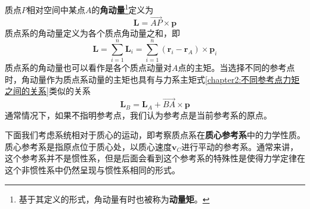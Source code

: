 质点$P$相对空间中某点$A$的{\bf 角动量}\footnote{基于其定义的形式，角动量有时也被称为{\bf 动量矩}。}定义为
\begin{equation}
	\boldsymbol{L} = \vec{AP} \times \boldsymbol{p}
\end{equation}
质点系的角动量定义为各个质点角动量之和，即
\begin{equation}
	\boldsymbol{L} = \sum_{i=1}^n \boldsymbol{L}_i = \sum_{i=1}^n (\boldsymbol{r}_i - \boldsymbol{r}_A) \times\boldsymbol{p}_i
	\label{chapter2:系统角动量的定义式}
\end{equation}
质点系的角动量也可以看作是各个质点动量对$A$点的主矩。当选择不同的参考点时，角动量作为质点系动量的主矩也具有与力系主矩式\eqref{chapter2:不同参考点力矩之间的关系}类似的关系
\begin{equation}
	\boldsymbol{L}_B = \boldsymbol{L}_A + \vec{BA} \times \boldsymbol{p}
\end{equation}
通常情况下，如果不指明参考点，我们认为参考点是当前参考系的原点。

下面我们考虑系统相对于质心的运动，即考察质点系在{\bf 质心参考系}中的力学性质。质心参考系是指原点位于质心处，以质心速度$\boldsymbol{v}_C$进行平动的参考系。通常来讲，这个参考系并不是惯性系，但是后面会看到这个参考系的特殊性是使得力学定律在这个非惯性系中仍然呈现与惯性系相同的形式。

